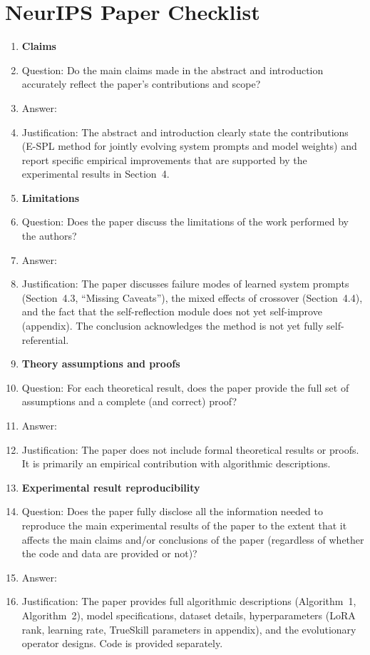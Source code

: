 \section*{NeurIPS Paper Checklist}



\begin{enumerate}

\item {\bf Claims}
    \item[] Question: Do the main claims made in the abstract and introduction accurately reflect the paper's contributions and scope?
    \item[] Answer: \answerYes{}
    \item[] Justification: The abstract and introduction clearly state the contributions (E-SPL method for jointly evolving system prompts and model weights) and report specific empirical improvements that are supported by the experimental results in Section~4.

\item {\bf Limitations}
    \item[] Question: Does the paper discuss the limitations of the work performed by the authors?
    \item[] Answer: \answerYes{}
    \item[] Justification: The paper discusses failure modes of learned system prompts (Section~4.3, ``Missing Caveats''), the mixed effects of crossover (Section~4.4), and the fact that the self-reflection module does not yet self-improve (appendix). The conclusion acknowledges the method is not yet fully self-referential.

\item {\bf Theory assumptions and proofs}
    \item[] Question: For each theoretical result, does the paper provide the full set of assumptions and a complete (and correct) proof?
    \item[] Answer: \answerNA{}
    \item[] Justification: The paper does not include formal theoretical results or proofs. It is primarily an empirical contribution with algorithmic descriptions.

    \item {\bf Experimental result reproducibility}
    \item[] Question: Does the paper fully disclose all the information needed to reproduce the main experimental results of the paper to the extent that it affects the main claims and/or conclusions of the paper (regardless of whether the code and data are provided or not)?
    \item[] Answer: \answerYes{}
    \item[] Justification: The paper provides full algorithmic descriptions (Algorithm~1, Algorithm~2), model specifications, dataset details, hyperparameters (LoRA rank, learning rate, TrueSkill parameters in appendix), and the evolutionary operator designs. Code is provided separately.


\end{enumerate}

